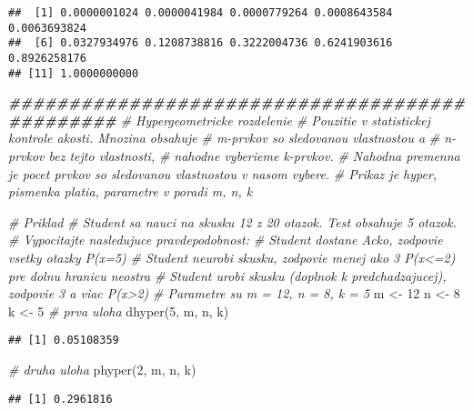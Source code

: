 \documentclass[
]{article}
\newenvironment{Shaded}{\begin{snugshade}}{\end{snugshade}}
\newcommand{\CommentTok}[1]{\textcolor[rgb]{0.56,0.35,0.01}{\textit{#1}}}
\newcommand{\DecValTok}[1]{\textcolor[rgb]{0.00,0.00,0.81}{#1}}
\newcommand{\DocumentationTok}[1]{\textcolor[rgb]{0.56,0.35,0.01}{\textbf{\textit{#1}}}}
\newcommand{\FunctionTok}[1]{\textcolor[rgb]{0.00,0.00,0.00}{#1}}
\newcommand{\NormalTok}[1]{#1}
\newcommand{\OtherTok}[1]{\textcolor[rgb]{0.56,0.35,0.01}{#1}}
\begin{document}
\begin{verbatim}
##  [1] 0.0000001024 0.0000041984 0.0000779264 0.0008643584 0.0063693824
##  [6] 0.0327934976 0.1208738816 0.3222004736 0.6241903616 0.8926258176
## [11] 1.0000000000
\end{verbatim}

\begin{Shaded}
\begin{Highlighting}[]
\DocumentationTok{\#\#\#\#\#\#\#\#\#\#\#\#\#\#\#\#\#\#\#\#\#\#\#\#\#\#\#\#\#\#\#\#\#\#\#\#\#\#\#\#\#\#\#\#\#\#\#}
\CommentTok{\# Hypergeometricke rozdelenie}
\CommentTok{\# Pouzitie v statistickej kontrole akosti. Mnozina obsahuje}
\CommentTok{\# m{-}prvkov so sledovanou vlastnostou a}
\CommentTok{\# n{-}prvkov bez tejto vlastnosti,}
\CommentTok{\# nahodne vyberieme k{-}prvkov.}
\CommentTok{\# Nahodna premenna je pocet prvkov so sledovanou vlastnostou v nasom vybere.}
\CommentTok{\# Prikaz je hyper, pismenka platia, parametre v poradi m, n, k}

\CommentTok{\# Priklad}
\CommentTok{\# Student sa nauci na skusku 12 z 20 otazok. Test obsahuje 5 otazok.}
\CommentTok{\# Vypocitajte nasledujuce pravdepodobnost:}
\CommentTok{\# Student dostane Acko, zodpovie vsetky otazky P(x=5)}
\CommentTok{\# Student neurobi skusku, zodpovie menej ako 3 P(x\textless{}=2)  pre dolnu hranicu neostra}
\CommentTok{\# Student urobi skusku (doplnok k predchadzajucej), zodpovie 3 a viac P(x\textgreater{}2)}
\CommentTok{\# Parametre su m = 12, n = 8, k = 5}
\NormalTok{m }\OtherTok{\textless{}{-}} \DecValTok{12}
\NormalTok{n }\OtherTok{\textless{}{-}} \DecValTok{8}
\NormalTok{k }\OtherTok{\textless{}{-}} \DecValTok{5}
\CommentTok{\# prva uloha}
\FunctionTok{dhyper}\NormalTok{(}\DecValTok{5}\NormalTok{, m, n, k)}
\end{Highlighting}
\end{Shaded}

\begin{verbatim}
## [1] 0.05108359
\end{verbatim}

\begin{Shaded}
\begin{Highlighting}[]
\CommentTok{\# druha uloha}
\FunctionTok{phyper}\NormalTok{(}\DecValTok{2}\NormalTok{, m, n, k)}
\end{Highlighting}
\end{Shaded}

\begin{verbatim}
## [1] 0.2961816
\end{verbatim}
\end{document}
